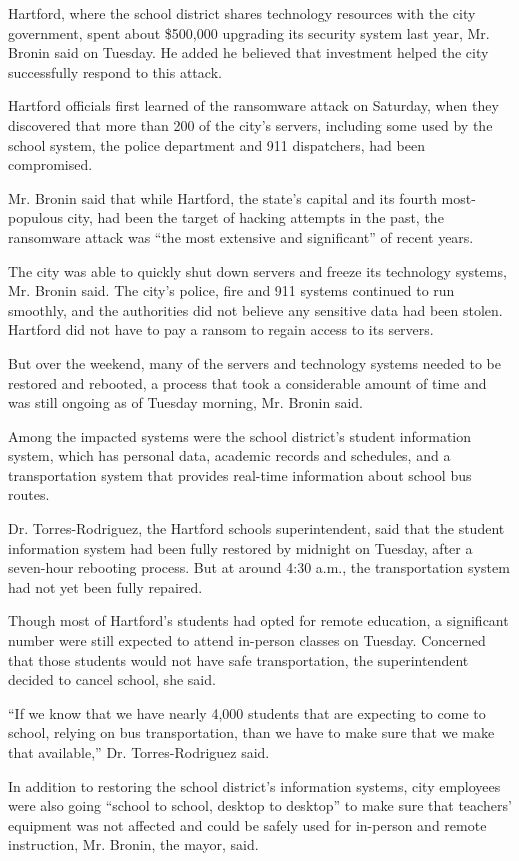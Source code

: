 Hartford, where the school district shares technology resources with the
city government, spent about \$500,000 upgrading its security system
last year, Mr. Bronin said on Tuesday. He added he believed that
investment helped the city successfully respond to this attack.

Hartford officials first learned of the ransomware attack on Saturday,
when they discovered that more than 200 of the city's servers, including
some used by the school system, the police department and 911
dispatchers, had been compromised.

Mr. Bronin said that while Hartford, the state's capital and its fourth
most-populous city, had been the target of hacking attempts in the past,
the ransomware attack was ``the most extensive and significant'' of
recent years.

The city was able to quickly shut down servers and freeze its technology
systems, Mr. Bronin said. The city's police, fire and 911 systems
continued to run smoothly, and the authorities did not believe any
sensitive data had been stolen. Hartford did not have to pay a ransom to
regain access to its servers.

But over the weekend, many of the servers and technology systems needed
to be restored and rebooted, a process that took a considerable amount
of time and was still ongoing as of Tuesday morning, Mr. Bronin said.

Among the impacted systems were the school district's student
information system, which has personal data, academic records and
schedules, and a transportation system that provides real-time
information about school bus routes.

Dr. Torres-Rodriguez, the Hartford schools superintendent, said that the
student information system had been fully restored by midnight on
Tuesday, after a seven-hour rebooting process. But at around 4:30 a.m.,
the transportation system had not yet been fully repaired.

Though most of Hartford's students had opted for remote education, a
significant number were still expected to attend in-person classes on
Tuesday. Concerned that those students would not have safe
transportation, the superintendent decided to cancel school, she said.

``If we know that we have nearly 4,000 students that are expecting to
come to school, relying on bus transportation, than we have to make sure
that we make that available,'' Dr. Torres-Rodriguez said.

In addition to restoring the school district's information systems, city
employees were also going ``school to school, desktop to desktop'' to
make sure that teachers' equipment was not affected and could be safely
used for in-person and remote instruction, Mr. Bronin, the mayor, said.

